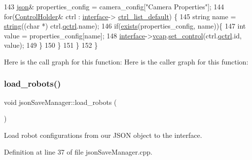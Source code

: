\begin{DoxyCode}
143         \hyperlink{classnlohmann_1_1basic__json}{json}& properties\_config = camera\_config[\textcolor{stringliteral}{"Camera Properties"}];
144         \textcolor{keywordflow}{for}(\hyperlink{struct_v_s_s_s___g_u_i_1_1____ctrl__holder}{ControlHolder}& ctrl : \hyperlink{classjson_save_manager_a91983cf64bdd03c74cd6d4576cb521cf}{interface}->
      \hyperlink{class_v_s_s_s___g_u_i_1_1_v4_l_interface_a97faf21f7b67c8ef15ceeafa377c6ea4}{ctrl\_list\_default}) \{
145             \textcolor{keywordtype}{string} name = \hyperlink{namespacenlohmann_1_1detail_a1ed8fc6239da25abcaf681d30ace4985ab45cffe084dd3d20d928bee85e7b0f21}{string}((\textcolor{keywordtype}{char} *) ctrl.\hyperlink{struct_v_s_s_s___g_u_i_1_1____ctrl__holder_ab215a49cfe0350894f78df2243fd0148}{qctrl}.name);
146             \textcolor{keywordflow}{if}(\hyperlink{classjson_save_manager_a850cd6da63a9b10437c1dc7424dfee13}{exists}(properties\_config, name))\{
147                 \textcolor{keywordtype}{int} value = properties\_config[name];
148                 \hyperlink{classjson_save_manager_a91983cf64bdd03c74cd6d4576cb521cf}{interface}->\hyperlink{class_v_s_s_s___g_u_i_1_1_v4_l_interface_a7ece61f4ccc6d5321c445e60f34e7f33}{vcap}.\hyperlink{classv4lcap_a863a15d2d66cc0b7367dcc9cba64e0bd}{set\_control}(ctrl.\hyperlink{struct_v_s_s_s___g_u_i_1_1____ctrl__holder_ab215a49cfe0350894f78df2243fd0148}{qctrl}.id, value);
149             \}
150         \}
151     \}
152 \}
\end{DoxyCode}
Here is the call graph for this function\+:
Here is the caller graph for this function\+:
\mbox{\label{classjson_save_manager_a6ddf4a28c77c83f37e3771177226c960}} 
\subsubsection{\texorpdfstring{load\+\_\+robots()}{load\_robots()}}
{\footnotesize\ttfamily void json\+Save\+Manager\+::load\+\_\+robots (\begin{DoxyParamCaption}{ }\end{DoxyParamCaption})}



Load robot configurations from our J\+S\+ON object to the interface. 



Definition at line 37 of file json\+Save\+Manager.\+cpp.



